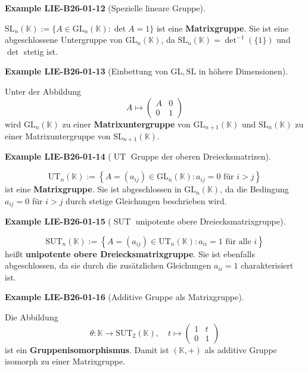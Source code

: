 \documentclass[10pt, letterpaper]{article}
\newcommand{\GL}{\mathrm{GL}}
\newcommand{\SL}{\mathrm{SL}}
\newcommand{\CustomHeading}[3]{%
  \par\medskip\noindent%
  \textbf{#1 #2} \textnormal{(#3)}.\enskip%
}
\newenvironment{EXA}[2]{\begin{unitbox}\CustomHeading{Example}{#1}{#2}}{\end{unitbox}}
\begin{document}
\begin{EXA}{LIE-B26-01-12}{Spezielle lineare Gruppe}
$\mathrm{SL}_{n}(\mathbb{K}) := \{A \in \mathrm{GL}_{n}(\mathbb{K}) : \det A = 1\}$  
ist eine \textbf{Matrixgruppe}.  
Sie ist eine abgeschlossene Untergruppe von $\mathrm{GL}_{n}(\mathbb{K})$, da $\mathrm{SL}_{n}(\mathbb{K}) = \det^{-1}(\{1\})$ und $\det$ stetig ist.
\end{EXA}



\begin{EXA}{LIE-B26-01-13}{Einbettung von $\GL,\SL$ in höhere Dimensionen}
Unter der Abbildung
\[
A \longmapsto 
\begin{pmatrix}
A & 0 \\[3pt]
0 & 1
\end{pmatrix}
\]
wird $\mathrm{GL}_{n}(\mathbb{K})$ zu einer \textbf{Matrixuntergruppe} von $\mathrm{GL}_{n+1}(\mathbb{K})$  
und $\mathrm{SL}_{n}(\mathbb{K})$ zu einer Matrixuntergruppe von $\mathrm{SL}_{n+1}(\mathbb{K})$.
\end{EXA}



\begin{EXA}{LIE-B26-01-14}{$\operatorname{UT}$ Gruppe der oberen Dreiecksmatrizen}
\[
\mathrm{UT}_{n}(\mathbb{K}) := 
\left\{
A = (a_{ij}) \in \mathrm{GL}_{n}(\mathbb{K}) : a_{ij} = 0 \text{ für } i > j
\right\}
\]
ist eine \textbf{Matrixgruppe}.  
Sie ist abgeschlossen in $\mathrm{GL}_{n}(\mathbb{K})$, da die Bedingung $a_{ij}=0$ für $i>j$ durch stetige Gleichungen beschrieben wird.
\end{EXA}



\begin{EXA}{LIE-B26-01-15}{$\operatorname{SUT}$ unipotente obere Dreiecksmatrixgruppe}
\[
\mathrm{SUT}_{n}(\mathbb{K}) := 
\left\{
A = (a_{ij}) \in \mathrm{UT}_{n}(\mathbb{K}) : a_{ii} = 1 \text{ für alle } i
\right\}
\]
heißt \textbf{unipotente obere Dreiecksmatrixgruppe}.  
Sie ist ebenfalls abgeschlossen, da sie durch die zusätzlichen Gleichungen $a_{ii}=1$ charakterisiert ist.
\end{EXA}



\begin{EXA}{LIE-B26-01-16}{Additive Gruppe als Matrixgruppe}
Die Abbildung
\[
\theta: \mathbb{K} \longrightarrow \mathrm{SUT}_{2}(\mathbb{K}), 
\quad t \longmapsto 
\begin{pmatrix}
1 & t \\[3pt]
0 & 1
\end{pmatrix}
\]
ist ein \textbf{Gruppenisomorphismus}.  
Damit ist $(\mathbb{K},+)$ als additive Gruppe isomorph zu einer Matrixgruppe.
\end{EXA}
\end{document}
